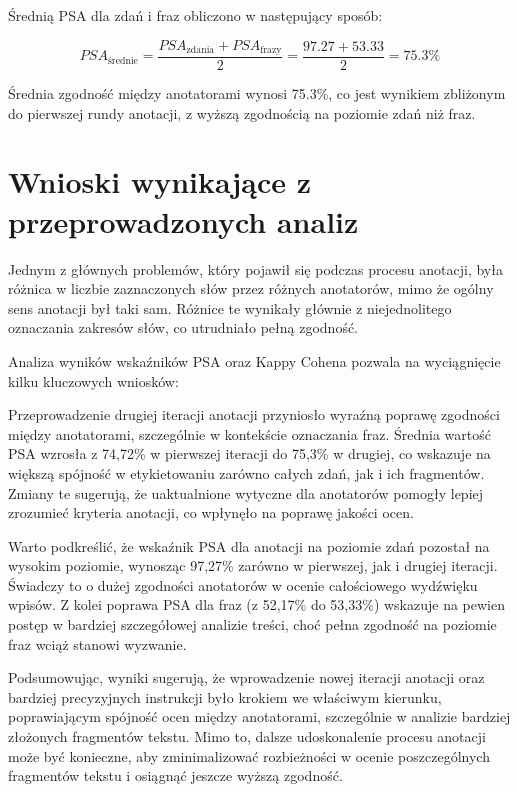 \documentclass[12pt]{article}
\begin{document}
Średnią PSA dla zdań i fraz obliczono w następujący sposób:

\begin{dmath}
PSA_{\text{średnie}} = \frac{PSA_{\text{zdania}} + PSA_{\text{frazy}}}{2} = \frac{97.27 + 53.33}{2} = 75.3\%
\end{dmath}

Średnia zgodność między anotatorami wynosi 75.3\%, co jest wynikiem zbliżonym do pierwszej rundy anotacji, z wyższą zgodnością na poziomie zdań niż fraz.

\section{Wnioski wynikające z przeprowadzonych analiz}

Jednym z głównych problemów, który pojawił się podczas procesu anotacji, była różnica w liczbie zaznaczonych słów przez różnych anotatorów, mimo że ogólny sens anotacji był taki sam. Różnice te wynikały głównie z niejednolitego oznaczania zakresów słów, co utrudniało pełną zgodność.

Analiza wyników wskaźników PSA oraz Kappy Cohena pozwala na wyciągnięcie kilku kluczowych wniosków:

Przeprowadzenie drugiej iteracji anotacji przyniosło wyraźną poprawę zgodności między anotatorami, szczególnie w kontekście oznaczania fraz. Średnia wartość PSA wzrosła z 74,72\% w pierwszej iteracji do 75,3\% w drugiej, co wskazuje na większą spójność w etykietowaniu zarówno całych zdań, jak i ich fragmentów. Zmiany te sugerują, że uaktualnione wytyczne dla anotatorów pomogły lepiej zrozumieć kryteria anotacji, co wpłynęło na poprawę jakości ocen.

Warto podkreślić, że wskaźnik PSA dla anotacji na poziomie zdań pozostał na wysokim poziomie, wynosząc 97,27\% zarówno w pierwszej, jak i drugiej iteracji. Świadczy to o dużej zgodności anotatorów w ocenie całościowego wydźwięku wpisów. Z kolei poprawa PSA dla fraz (z 52,17\% do 53,33\%) wskazuje na pewien postęp w bardziej szczegółowej analizie treści, choć pełna zgodność na poziomie fraz wciąż stanowi wyzwanie.

Podsumowując, wyniki sugerują, że wprowadzenie nowej iteracji anotacji oraz bardziej precyzyjnych instrukcji było krokiem we właściwym kierunku, poprawiającym spójność ocen między anotatorami, szczególnie w analizie bardziej złożonych fragmentów tekstu. Mimo to, dalsze udoskonalenie procesu anotacji może być konieczne, aby zminimalizować rozbieżności w ocenie poszczególnych fragmentów tekstu i osiągnąć jeszcze wyższą zgodność.
\end{document}
